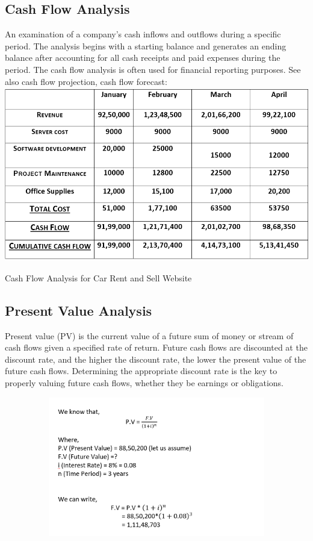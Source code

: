 \documentclass[10pt,twosides]{report}
\begin{document}
\begin{table}
\subsection{    Cash Flow Analysis}
\noindent An examination of a company's cash inflows and outflows during a specific period. The analysis begins with a starting balance and generates an ending balance after accounting for all cash receipts and paid expenses during the period. The cash flow analysis is often used for financial reporting purposes. See also cash flow projection, cash flow forecast:\\


\includegraphics*[width=5.51in,height=3in]{figures/CashFlow}
\caption{Cash Flow Analysis for Car Rent and Sell Website} 
 
\subsection{    Present Value Analysis}

\noindent Present value (PV) is the current value of a future sum of money or stream of cash flows given a specified rate of return. Future cash flows are discounted at the discount rate, and the higher the discount rate, the lower the present value of the future cash flows. Determining the appropriate discount rate is the key to properly valuing future cash flows, whether they be earnings or obligations.

\noindent \includegraphics*[width=5.71in, height=2.4in]{figures/PV}

\end{table}
\end{document}
